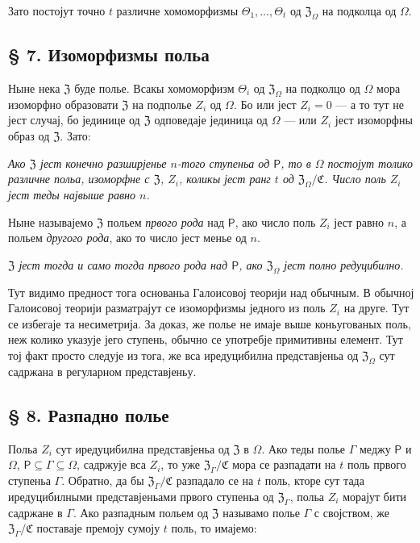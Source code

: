 \documentclass[11pt]{article}
\begin{document}
Зато постојут точно \(t\) различне хомоморфизмы \(\Theta_1,\ldots,\Theta_t\) од \(\mathfrak Z_\Omega\) на подколца од \(\Omega\).

\subsection*{§ 7. Изоморфизмы польа}\label{die-isomorphismen-eines-koerpers}

Ныне нека \(\mathfrak Z\) буде полье. Всакы хомоморфизм \(\Theta_i\) од \(\mathfrak Z_\Omega\) на подколцо од \(\Omega\) мора изоморфно образовати \(\mathfrak Z\) на подполье \(Z_i\) од \(\Omega\). Бо или јест \(Z_i=0\) --- а то тут не јест случај, бо јединице од \(\mathfrak Z\) одповедаје јединица од \(\Omega\) --- или \(Z_i\) јест изоморфны образ од \(\mathfrak Z\). Зато:

\emph{Ако \(\mathfrak Z\) јест конечно разширјенье \(n\)-того ступеньа од \(\mathsf P\), то в \(\Omega\) постојут толико различне польа, изоморфне с \(\mathfrak Z\), \(Z_i\), коликы јест ранг \(t\) од \(\mathfrak Z_\Omega/\mathfrak C\). Число поль \(Z_i\) јест теды највыше равно \(n\).}

Ныне называјемо \(\mathfrak Z\) польем \emph{првого рода} над \(\mathsf P\), ако число поль \(Z_i\) јест равно \(n\), а польем \emph{другого рода}, ако то число јест менье од \(n\).

\emph{\(\mathfrak Z\) јест тогда и само тогда првого рода над \(\mathsf P\), ако \(\mathfrak Z_\Omega\) јест полно редуцибилно.}

Тут видимо предност тога основаньа Галоисовој теорији над обычным. В обычној Галоисовој теорији разматрајут се изоморфизмы једного из поль \(Z_i\) на друге. Тут се избегаје та несиметрија. За доказ, же полье не имаје выше коньугованых поль, неж колико указује јего ступень, обычно се употребје примитивны елемент. Тут тој факт просто следује из тога, же вса иредуцибилна представјеньа од \(\mathfrak Z_\Omega\) сут садржана в регуларном представјеньу.

\subsection*{§ 8. Разпадно полье}\label{der-zerfaellungskoerper}

Польа \(Z_i\) сут иредуцибилна представјеньа од \(\mathfrak Z\) в \(\Omega\). Ако теды полье \(\Gamma\) меджу \(\mathsf P\) и \(\Omega\), \(\mathsf P\subseteq\Gamma\subseteq\Omega\), садржује вса \(Z_i\), то уже \(\mathfrak Z_\Gamma/\mathfrak C\) мора се разпадати на \(t\) поль првого ступеньа \(\Gamma\). Обратно, да бы \(\mathfrak Z_\Gamma/\mathfrak C\) разпадало се на \(t\) поль, кторе сут тада иредуцибилными представјеньами првого ступеньа од \(\mathfrak Z_\Gamma\), польа \(Z_i\) морајут бити садржане в \(\Gamma\). Ако разпадным польем од \(\mathfrak Z\) называмо полье \(\Gamma\) с својством, же \(\mathfrak Z_\Gamma/\mathfrak C\) поставаје премоју сумоју \(t\) поль, то имајемо:
\end{document}
